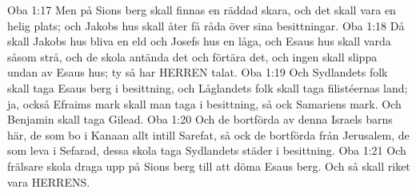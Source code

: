 Oba 1:17  Men på Sions berg skall finnas en räddad skara, och det skall vara en helig plats; och Jakobs hus skall åter få råda över sina besittningar.
Oba 1:18  Då skall Jakobs hus bliva en eld och Josefs hus en låga, och Esaus hus skall varda såsom strå, och de skola antända det och förtära det, och ingen skall slippa undan av Esaus hus; ty så har HERREN talat.
Oba 1:19  Och Sydlandets folk skall taga Esaus berg i besittning, och Låglandets folk skall taga filistéernas land; ja, också Efraims mark skall man taga i besittning, så ock Samariens mark. Och Benjamin skall taga Gilead.
Oba 1:20  Och de bortförda av denna Israels barns här, de som bo i Kanaan allt intill Sarefat, så ock de bortförda från Jerusalem, de som leva i Sefarad, dessa skola taga Sydlandets städer i besittning.
Oba 1:21  Och frälsare skola draga upp på Sions berg till att döma Esaus berg. Och så skall riket vara HERRENS.


